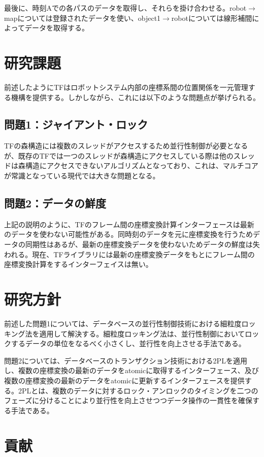 \documentclass[a4paper]{jreport}	%
\begin{document}
最後に、時刻Aでの各パスのデータを取得し、それらを掛け合わせる。robot$\rightarrow$mapについては登録されたデータを使い、object1$\rightarrow$robotについては線形補間によってデータを取得する。

\section{研究課題}
前述したようにTFはロボットシステム内部の座標系間の位置関係を一元管理する機構を提供する。しかしながら、これには以下のような問題点が挙げられる。

\subsection*{問題1：ジャイアント・ロック}
TFの森構造には複数のスレッドがアクセスするため並行性制御が必要となるが、既存のTFでは一つのスレッドが森構造にアクセスしている際は他のスレッドは森構造にアクセスできないアルゴリズムとなっており、これは、マルチコアが常識となっている現代では大きな問題となる。

\subsection*{問題2：データの鮮度}

上記の説明のように、TFのフレーム間の座標変換計算インターフェースは最新のデータを使わない可能性がある。同時刻のデータを元に座標変換を行うためデータの同期性はあるが、最新の座標変換データを使わないためデータの鮮度は失われる。現在、TFライブラリには最新の座標変換データをもとにフレーム間の座標変換計算をするインターフェイスは無い。

\section{研究方針}
前述した問題1については、データベースの並行性制御技術における細粒度ロッキング法を適用して解決する。細粒度ロッキング法は、並行性制御においてロックするデータの単位をなるべく小さくし、並行性を向上させる手法である。

問題2については、データベースのトランザクション技術における2PLを適用し、複数の座標変換の最新のデータをatomicに取得するインターフェース、及び複数の座標変換の最新のデータをatomicに更新するインターフェースを提供する。2PLとは、複数のデータに対するロック・アンロックのタイミングを二つのフェーズに分けることにより並行性を向上させつつデータ操作の一貫性を確保する手法である。

\section{貢献}
\end{document}
